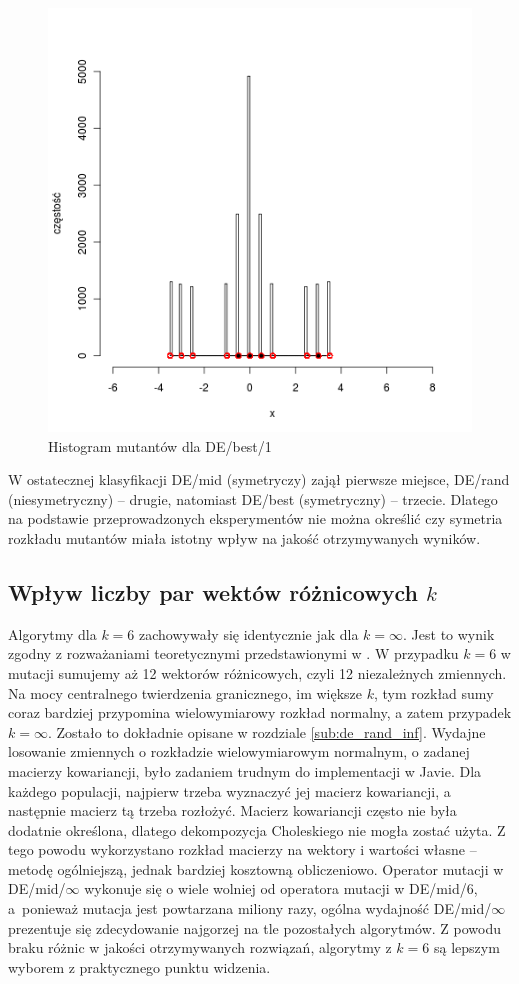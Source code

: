 \documentclass[a4paper,onecolumn,oneside,12pt,wide,floatssmall]{mwrep}
\theoremstyle{definition}
\theoremstyle{plain}%
\theoremstyle{remark}
\begin{document}
\begin{figure}[H]
\centering
\includegraphics[width=.65\textwidth]{img/best}
\caption{Histogram mutantów dla DE/best/1} 
\label{fig:sym_best}
\end{figure}

W ostatecznej klasyfikacji DE/mid (symetryczy) zajął pierwsze miejsce, 
DE/rand (niesymetryczny) -- drugie, natomiast DE/best (symetryczny) -- trzecie.
Dlatego na podstawie przeprowadzonych eksperymentów nie można określić czy symetria rozkładu 
mutantów miała istotny wpływ na jakość otrzymywanych wyników. 

\subsection{Wpływ liczby par wektów różnicowych $k$}

Algorytmy dla $k = 6$ zachowywały się identycznie jak dla $k = \infty$. Jest to wynik zgodny
z rozważaniami teoretycznymi przedstawionymi w \cite{decomposition}. 
W przypadku $k = 6$ w mutacji sumujemy aż 12 wektorów różnicowych,
czyli 12 niezależnych zmiennych. Na mocy centralnego twierdzenia granicznego,
im większe $k$, tym rozkład sumy coraz bardziej przypomina wielowymiarowy rozkład normalny,
a zatem przypadek $k=\infty$. Zostało to dokładnie opisane w rozdziale \ref{sub:de_rand_inf}.
Wydajne losowanie zmiennych o rozkładzie wielowymiarowym normalnym, o zadanej
macierzy kowariancji, było zadaniem trudnym do implementacji w Javie.
Dla każdego populacji, najpierw trzeba wyznaczyć jej macierz kowariancji, a następnie macierz
tą trzeba rozłożyć. Macierz kowariancji często nie była dodatnie określona, 
dlatego dekompozycja Choleskiego nie mogła zostać użyta.
Z tego powodu wykorzystano rozkład macierzy na wektory i wartości własne -- metodę ogólniejszą, jednak
bardziej kosztowną obliczeniowo. Operator mutacji w DE/mid/$\infty$ wykonuje się o wiele
wolniej od operatora mutacji w DE/mid/6, a~ponieważ mutacja jest powtarzana miliony
razy, ogólna wydajność DE/mid/$\infty$ prezentuje się zdecydowanie najgorzej na tle pozostałych
algorytmów. Z powodu braku różnic w jakości otrzymywanych rozwiązań,
 algorytmy z $k = 6$ są lepszym wyborem z praktycznego punktu widzenia.
\end{document}
